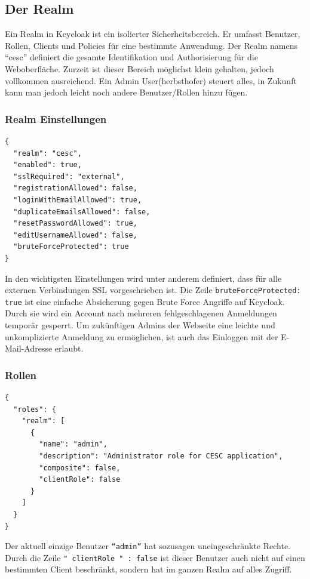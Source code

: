 \subsection{Der Realm}
Ein Realm in Keycloak ist ein isolierter Sicherheitsbereich. Er umfasst Benutzer, Rollen, Clients und Policies für eine bestimmte Anwendung. Der Realm namens ``cesc'' definiert die gesamte Identifikation und Authorisierung für die Weboberfläche. Zurzeit ist dieser Bereich möglichst klein gehalten, jedoch vollkommen ausreichend. Ein Admin User(herbsthofer) steuert alles, in Zukunft kann man jedoch leicht noch andere Benutzer/Rollen hinzu fügen.
\subsubsection{Realm Einstellungen}

\begin{lstlisting}[caption=Keycloak Realm Konfiguration,label=lst:keycloakrealmconfig,basicstyle=\ttfamily\small]
{
  "realm": "cesc",
  "enabled": true,
  "sslRequired": "external",
  "registrationAllowed": false,
  "loginWithEmailAllowed": true,
  "duplicateEmailsAllowed": false,
  "resetPasswordAllowed": true,
  "editUsernameAllowed": false,
  "bruteForceProtected": true
}
\end{lstlisting}
In den wichtigsten Einstellungen wird unter anderem definiert, dass für alle externen Verbindungen SSL vorgeschrieben ist.
Die Zeile \texttt{bruteForceProtected: true} ist eine einfache Absicherung gegen Brute Force Angriffe auf Keycloak. Durch sie wird ein Account nach mehreren fehlgeschlagenen Anmeldungen temporär gesperrt.
Um zukünftigen Admins der Webseite eine leichte und unkomplizierte Anmeldung zu ermöglichen, ist auch das Einloggen mit der E-Mail-Adresse erlaubt.

\subsubsection{Rollen}
\begin{lstlisting}[caption=Keycloak Rollen Konfiguration,label=lst:keycloakrealmroles,basicstyle=\ttfamily\small]
{
  "roles": {
    "realm": [
      {
        "name": "admin",
        "description": "Administrator role for CESC application",
        "composite": false,
        "clientRole": false
      }
    ]
  }
}
\end{lstlisting}
Der aktuell einzige Benutzer \texttt{``admin''} hat sozusagen uneingeschränkte Rechte. Durch die Zeile \texttt{" clientRole " : false} ist dieser Benutzer auch nicht auf einen bestimmten Client beschränkt, sondern hat im ganzen Realm auf alles Zugriff.

